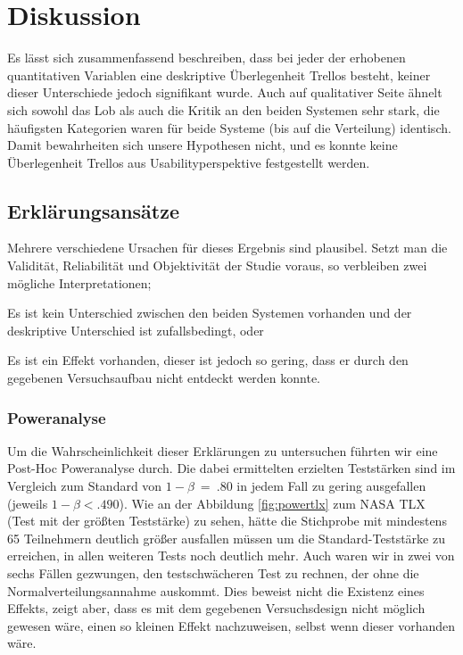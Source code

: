 \section{Diskussion}
Es lässt sich zusammenfassend beschreiben, dass bei jeder der erhobenen quantitativen Variablen eine deskriptive Überlegenheit Trellos besteht, keiner dieser Unterschiede jedoch signifikant wurde. 
Auch auf qualitativer Seite ähnelt sich sowohl das Lob als auch die Kritik an den beiden Systemen sehr stark, die häufigsten Kategorien waren für beide Systeme (bis auf die Verteilung) identisch.
Damit bewahrheiten sich unsere Hypothesen nicht, und es konnte keine Überlegenheit Trellos aus Usabilityperspektive festgestellt werden. 



\subsection{Erklärungsansätze}

Mehrere verschiedene Ursachen für dieses Ergebnis sind plausibel. 
Setzt man die Validität, Reliabilität und Objektivität der Studie voraus, so verbleiben zwei mögliche Interpretationen; 
\begin{seriate}
\item Es ist kein Unterschied zwischen den beiden Systemen vorhanden und der deskriptive Unterschied ist zufallsbedingt, oder
\item Es ist ein Effekt vorhanden, dieser ist jedoch so gering, dass er durch den gegebenen Versuchsaufbau nicht entdeckt werden konnte.
\end{seriate}

\subsubsection{Poweranalyse}
Um die Wahrscheinlichkeit dieser Erklärungen zu untersuchen führten wir eine Post-Hoc Poweranalyse durch. Die dabei ermittelten erzielten Teststärken sind im Vergleich zum Standard von $1-\beta~=~.80$ in jedem Fall zu gering ausgefallen (jeweils $1-\beta<.490$). Wie an der Abbildung \ref{fig:powertlx} zum NASA TLX (Test mit der größten Teststärke) zu sehen, hätte die Stichprobe mit mindestens 65 Teilnehmern deutlich größer ausfallen müssen um die Standard-Teststärke zu erreichen, in allen weiteren Tests noch deutlich mehr. Auch waren wir in zwei von sechs Fällen gezwungen, den testschwächeren Test zu rechnen, der ohne die Normalverteilungsannahme auskommt.
Dies beweist nicht die Existenz eines Effekts, zeigt aber, dass es mit dem gegebenen Versuchsdesign nicht möglich gewesen wäre, einen so kleinen Effekt nachzuweisen, selbst wenn dieser vorhanden wäre.

